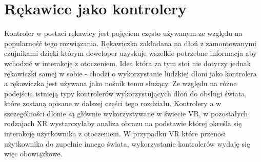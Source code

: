 \chapter{Rękawice jako kontrolery}
\label{ch:kontrolery}
Kontroler w postaci rękawicy jest pojęciem często używanym ze względu na popularność tego rozwiązania. Rękawiczka zakładana na dłoń z zamontowanymi czujnikami dzięki którym deweloper uzyskuje wszelkie potrzebne informacja aby wchodzić w interakcję z otoczeniem. Idea która za tym stoi nie dotyczy jednak rękawiczki samej w sobie - chodzi o wykorzystanie ludzkiej dłoni jako kontrolera a rękawiczka jest używana jako nośnik temu służący. Ze względu na różne podejścia istnieją typy kontrolerów wykorzystujących dłoń do obsługi świata, które zostaną opisane w dalszej części tego rozdziału. Kontrolery a w szczególności dłonie są głównie wykorzystywane w świecie VR, w pozostałych rodzajach XR wystarczyłaby analiza obrazu na podstawie której określa się interakcję użytkownika z otoczeniem. W przypadku VR które przenosi użytkownika do zupełnie innego świata, wykorzystanie kontrolerów wydaję się więc obowiązkowe.  
